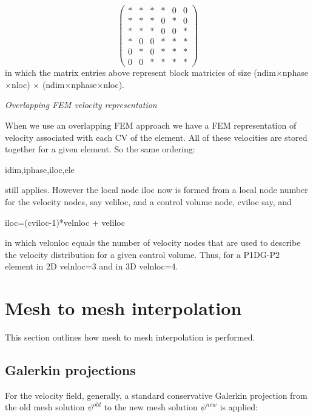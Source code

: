 \begin{equation}
  \begin{pmatrix}
*  &  *  &  *      &   *   &  0  &  0  \\
*  &  *  &  *      &   0   &  *  &  0  \\
*  &  *  &  *      &   0   &  0  &  *  \\
%
*  &  0  &  0      &   *   &  *  &  *  \\
0  &  *  &  0      &   *   &  *  &  *  \\
0  &  0  &  *      &   *   &  *  &  *
  \end{pmatrix}
\label{Vel-Mphase-mat-spar}
\end{equation}
in which the matrix entries above represent block matricies of size (ndim$\times$nphase$\times$nloc)
$\times$  (ndim$\times$nphase$\times$nloc).


\par\noindent
{\it Overlapping FEM velocity representation}
\par\noindent
When we use an overlapping FEM approach we have a FEM representation of
velocity associated with each CV of the element. All of these velocities are stored
together for a given element. So the same ordering:
\par\noindent
idim,iphase,iloc,ele

\par\noindent
still applies. However the local node iloc now is formed from
a local node number for the velocity nodes, say veliloc, and
a control volume node, cviloc say, and
\par\noindent
iloc=(cviloc-1)*velnloc + veliloc

\par\noindent
in which velonloc equals the number of velocity nodes that are used
to describe the velocity distribution for a given control volume.
Thus, for a P1DG-P2 element in 2D velnloc=3 and in 3D velnloc=4.



\pagebreak



\section{Mesh to mesh interpolation}
\label{Mesh to mesh interpolation}

This section outlines how mesh to mesh interpolation is performed.


\subsection{Galerkin projections}
\label{Galerkin projections}
For the velocity field, generally, a standard conservative Galerkin projection
from the old mesh solution $\psi^{old}$ to the new mesh solution $\psi^{new}$ is applied:

